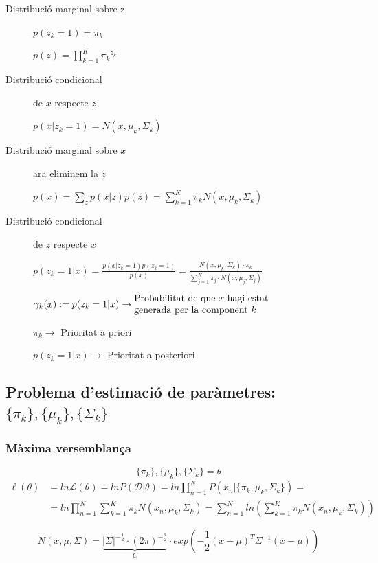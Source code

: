 \begin{description}
	\item[Distribució marginal sobre z] $p(z_k = 1) = \pi_k$
	
	$p(z) = \prod_{k=1}^K {\pi_k}^{z_k}$
	
	\item[Distribució condicional] de $x$ respecte $z$
	
	$p(x|z_k = 1) = N(x, \mu_k, \Sigma_k)$
	
	\item[Distribució marginal sobre $x$] ara eliminem la $z$
	
	$p(x) = \sum_z p(x|z)p(z) = \sum_{k=1}^K \pi_k N(x, \mu_k, \Sigma_k)$
	
	\item[Distribució condicional] de $z$ respecte $x$
	
	$p(z_k = 1|x) = \frac{p(x|z_k = 1)p(z_k = 1)}{p(x)} = 
	\frac{N(x, \mu_k, \Sigma_k)·\pi_k}{\sum_{j=1}^K \pi_j · N(x, \mu_j, \Sigma_j)}$
	
	$\gamma_k(x) := p(z_k = 1 | x) \to \parbox{14em}{Probabilitat de que $x$ hagi estat generada per la component $k$ }$
	
	$\pi_k \to$ Prioritat a priori
	
	$p(z_k = 1 | x) \to$ Prioritat a posteriori
\end{description}

\subsection{Problema d'estimació de paràmetres: $\{\pi_k\}, \{ \mu_k \}, \{ \Sigma_k \}$ }

\subsubsection{Màxima versemblança}

$$ \{\pi_k\}, \{ \mu_k \}, \{ \Sigma_k \} = \theta $$
\begin{align*}
	\ell(\theta) &= ln \mathcal{L}(\theta) = ln P(\mathcal{D}|\theta) =
	ln \prod_{n=1}^N P(x_n | \{\pi_k, \mu_k, \Sigma_k \}) = \\
	&= ln \prod_{n=1}^N \sum_{k=1}^K \pi_k N(x_n, \mu_k, \Sigma_k) = 
	\sum_{n=1}^N ln\left(\sum_{k=1}^K \pi_k N\left(x_n, \mu_k, \Sigma_k \right) \right)
\end{align*}

$$
N(x, \mu, \Sigma) = \underbrace{|\Sigma|^{-\frac{1}{2}}·(2\pi)^{-\frac{d}{2}}}_C·exp\left( -\frac{1}{2}(x - \mu)^T \Sigma^{-1}(x-\mu) \right)
$$

